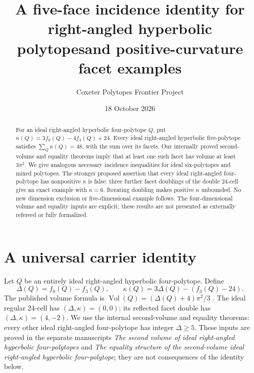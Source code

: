 \documentclass[11pt]{article}
\title{A five-face incidence identity for right-angled hyperbolic polytopes\linebreak and positive-curvature facet examples}
\author{Coxeter Polytopes Frontier Project}
\date{18 October 2026}
\begin{document}
\maketitle
\begin{abstract}
For an ideal right-angled hyperbolic four-polytope $Q$, put
$\kappa(Q)=3f_0(Q)-4f_3(Q)+24$. Every ideal right-angled hyperbolic
five-polytope satisfies $\sum_Q\kappa(Q)=48$, with the sum over its facets.
Our internally proved second-volume and equality theorems imply that at least
one such facet has volume at least $3\pi^2$. We give analogous necessary
incidence inequalities for ideal six-polytopes and mixed polytopes.
The stronger proposed assertion that every ideal right-angled four-polytope
has nonpositive $\kappa$ is false: three further facet doublings of the double
24-cell give an exact example with $\kappa=6$. Iterating doubling makes
positive $\kappa$ unbounded. No new dimension exclusion or five-dimensional
example follows. The four-dimensional volume and equality inputs are explicit;
these results are not presented as externally refereed or fully formalized.
\end{abstract}

\section{A universal carrier identity}
Let $Q$ be an entirely ideal right-angled hyperbolic four-polytope. Define
\[
 \Delta(Q)=f_0(Q)-f_3(Q),\qquad
 \kappa(Q)=3\Delta(Q)-(f_3(Q)-24).
\]
The published volume formula is
$\operatorname{Vol}(Q)=(\Delta(Q)+4)\pi^2/3$ \cite{Kolpakov}.
The ideal regular 24-cell has $(\Delta,\kappa)=(0,0)$; its reflected facet
double has $(\Delta,\kappa)=(4,-2)$. We use the internal second-volume and
equality theorems: every other ideal right-angled four-polytope has integer
$\Delta\ge5$. These inputs are proved in the separate manuscripts
\emph{The second volume of ideal right-angled hyperbolic four-polytopes} and
\emph{The equality structure of the second-volume ideal right-angled
hyperbolic four-polytope}; they are not consequences of the identity below.
\end{document}
